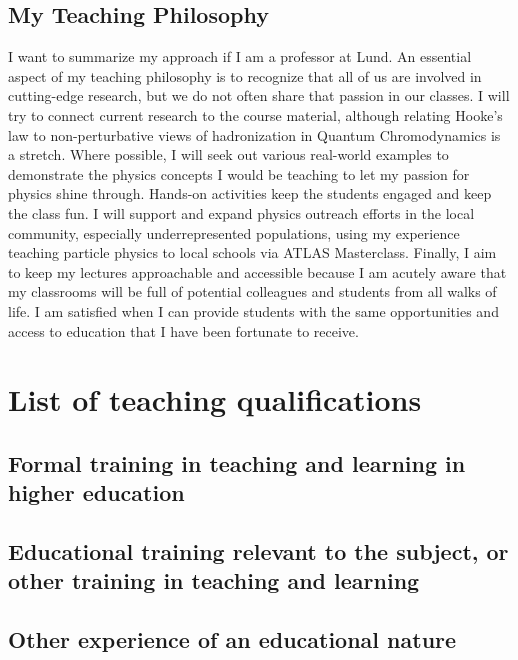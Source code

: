\subsection{My Teaching Philosophy} \label{ssec:my-teaching-philosophy}
I want to summarize my approach if I am a professor at Lund. An essential aspect of my teaching philosophy is to recognize that all of us are involved in cutting-edge research, but we do not often share that passion in our classes. I will try to connect current research to the course material, although relating Hooke's law to non-perturbative views of hadronization in Quantum Chromodynamics is a stretch. Where possible, I will seek out various real-world examples to demonstrate the physics concepts I would be teaching to let my passion for physics shine through. Hands-on activities keep the students engaged and keep the class fun. I will support and expand physics outreach efforts in the local community, especially underrepresented populations, using my experience teaching particle physics to local schools via ATLAS Masterclass. Finally, I aim to keep my lectures approachable and accessible because I am acutely aware that my classrooms will be full of potential colleagues and students from all walks of life. I am satisfied when I can provide students with the same opportunities and access to education that I have been fortunate to receive.

\section{List of teaching qualifications} \label{sec:list-of-teaching-qualifications}

\subsection{Formal training in teaching and learning in higher education \none}\label{ssec:formal-training-in-teaching-and-learning-in-higher-education-none}
\subsection{Educational training relevant to the subject, or other training in teaching and learning \none}\label{ssec:educational-training-relevant-to-the-subject-or-other-training-in-teaching-and-learning-none}
\subsection{Other experience of an educational nature \none}\label{ssec:other-experience-of-an-educational-nature-none}
